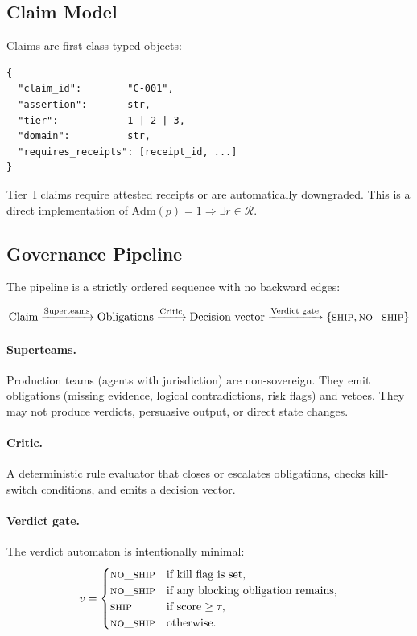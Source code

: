 \documentclass[11pt,a4paper]{article}
\theoremstyle{plain}
\theoremstyle{definition}
\theoremstyle{remark}
\newcommand{\Adm}{\mathrm{Adm}}
\newcommand{\SHIP}{\textsc{ship}}
\newcommand{\NOSHIP}{\textsc{no\textunderscore{}ship}}
\newcommand{\Rec}{\mathcal{R}}
\begin{document}
\subsection{Claim Model}

Claims are first-class typed objects:
\begin{lstlisting}[caption={Claim structure}]
{
  "claim_id":        "C-001",
  "assertion":       str,
  "tier":            1 | 2 | 3,
  "domain":          str,
  "requires_receipts": [receipt_id, ...]
}
\end{lstlisting}

Tier~I claims require attested receipts or are automatically downgraded.
This is a direct implementation of $\Adm(p) = 1 \Rightarrow \exists r \in \Rec$.

\subsection{Governance Pipeline}

The pipeline is a strictly ordered sequence with no backward edges:

\[
  \text{Claim}
  \xrightarrow{\text{Superteams}}
  \text{Obligations}
  \xrightarrow{\text{Critic}}
  \text{Decision vector}
  \xrightarrow{\text{Verdict gate}}
  \{\SHIP, \NOSHIP\}
\]

\paragraph{Superteams.}
Production teams (agents with jurisdiction) are non-sovereign.
They emit obligations (missing evidence, logical contradictions, risk flags)
and vetoes.
They may not produce verdicts, persuasive output, or direct state changes.

\paragraph{Critic.}
A deterministic rule evaluator that closes or escalates obligations,
checks kill-switch conditions, and emits a decision vector.

\paragraph{Verdict gate.}
The verdict automaton is intentionally minimal:
\[
  v =
  \begin{cases}
    \NOSHIP & \text{if kill flag is set,} \\
    \NOSHIP & \text{if any blocking obligation remains,} \\
    \SHIP   & \text{if score} \ge \tau, \\
    \NOSHIP & \text{otherwise.}
  \end{cases}
\]
\end{document}
